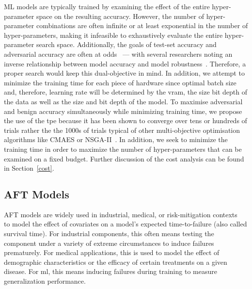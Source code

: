 \documentclass[sn-mathphys-num]{sn-jnl}%
\begin{document}
ML models are typically trained by examining the effect of the entire hyper-parameter space on the resulting accuracy. However, the number of hyper-parameter combinations are often infinite or at least exponential in the number of hyper-parameters,
making it infeasible to exhaustively evaluate the entire hyper-parameter search space. Additionally, the goals of test-set accuracy and adversarial accuracy are often at odds~\cite{carlini_towards_2017} --- with several researchers noting an inverse relationship between model accuracy and model robustness~\cite{carlini_towards_2017,meyers,dohmatob_generalized_2019}. Therefore, a proper search would keep this dual-objective in mind.
In addition, we attempt to minimize the training time for each piece of hardware since optimal batch size and, therefore, learning rate will be determined by the \acrshort{vram}, the size bit depth of the data as well as the size and bit depth of the model.
To maximise adversarial and benign accuracy simultaneously while minimizing training time, we propose the use of the \acrfull{tpe} because it has been shown to converge  over tens or hundreds of trials rather the the 1000s of trials typical of other multi-objective optimisation algorithms like CMAES or NSGA-II~\cite{ozaki2020multiobjective,optuna,tpe_params}.
In addition, we seek to minimize the training time in order to maximize the number of hyper-parameters that can be examined on a fixed budget. Further discussion of the cost analysis can be found in Section~\ref{cost}.




\subsection{AFT Models}
\label{survival_time}

AFT models are widely used in industrial, medical, or risk-mitigation contexts~\cite{kleinbaum1996survival,aft_models} to model the effect of covariates on a model's expected time-to-failure (also called survival time).
For industrial components, this often means testing the component under a variety  of extreme circumstances to induce failures prematurely.
For medical applications, this is used to model the effect of demographic characteristics or the efficacy of certain treatments on a given disease.
For \acrshort{ml}, this means inducing failures during training to measure generalization performance.
\end{document}
